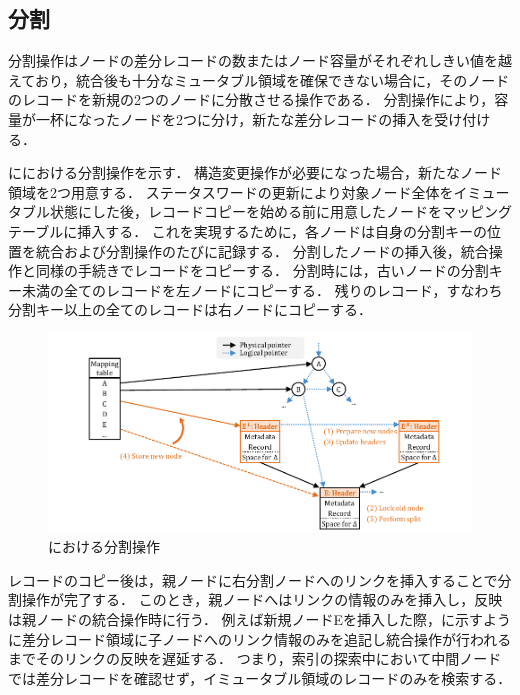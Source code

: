 \subsection{分割}

分割操作はノードの差分レコードの数またはノード容量がそれぞれしきい値を越えており，統合後も十分なミュータブル領域を確保できない場合に，そのノードのレコードを新規の2つのノードに分散させる操作である．
分割操作により，容量が一杯になったノードを2つに分け，新たな差分レコードの挿入を受け付ける．

\Fig{\ref{fig:bc_tree_split}}に\Bctree{}における分割操作を示す．
構造変更操作が必要になった場合，新たなノード領域を2つ用意する．
ステータスワードの更新により対象ノード全体をイミュータブル状態にした後，レコードコピーを始める前に用意したノードをマッピングテーブルに挿入する．
これを実現するために，各ノードは自身の分割キーの位置を統合および分割操作のたびに記録する．
分割したノードの挿入後，統合操作と同様の手続きでレコードをコピーする．
分割時には，古いノードの分割キー未満の全てのレコードを左ノードにコピーする．
残りのレコード，すなわち分割キー以上の全てのレコードは右ノードにコピーする．

\begin{figure}[t]
    \centering
    \includegraphics{./figures/Bc-split.pdf}
    \caption{\Bctree{}における分割操作}
    \label{fig:bc_tree_split}
\end{figure}

レコードのコピー後は，親ノードに右分割ノードへのリンクを挿入することで分割操作が完了する．
このとき，親ノードへはリンクの情報のみを挿入し，反映は親ノードの統合操作時に行う．
例えば新規ノードEを挿入した際，\Fig{\ref{fig:bc_tree_inner_nodes}}に示すように差分レコード領域に子ノードへのリンク情報のみを追記し統合操作が行われるまでそのリンクの反映を遅延する．
つまり，索引の探索中において中間ノードでは差分レコードを確認せず，イミュータブル領域のレコードのみを検索する．

